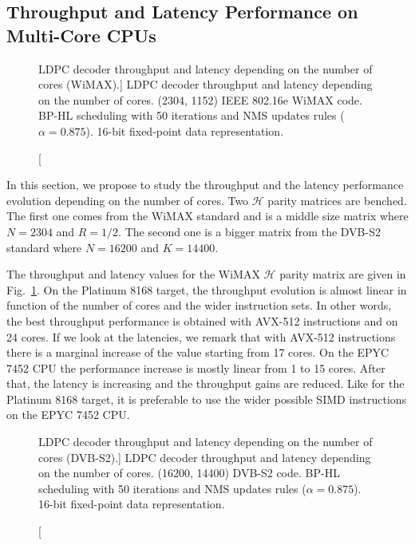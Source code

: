 \subsection{Throughput and Latency Performance on Multi-Core CPUs}

\begin{figure}[htp]
  \centering
  \quad
  \caption
    [LDPC decoder throughput and latency depending on the number of cores (WiMAX).]
    {LDPC decoder throughput and latency depending on the number of cores.
    (2304, 1152) IEEE 802.16e WiMAX code. BP-HL scheduling with 50 iterations
    and NMS updates rules ($\alpha = 0.875$). 16-bit fixed-point data
    representation.}
  \label{plot:eval_ldpc_WiMAX_thr_lat}
\end{figure}

In this section, we propose to study the throughput and the latency performance
evolution depending on the number of cores. Two $\mathcal{H}$ parity matrices
are benched. The first one comes from the WiMAX standard and is a middle size
matrix where $N = 2304$ and $R = 1/2$. The second one is a bigger matrix from
the DVB-S2 standard where $N = 16200$ and $K = 14400$.

The throughput and latency values for the WiMAX $\mathcal{H}$ parity matrix are
given in Fig.~\ref{plot:eval_ldpc_WiMAX_thr_lat}. On the Platinum 8168 target,
the throughput evolution is almost linear in function of the number of cores and
the wider instruction sets. In other words, the best throughput performance is
obtained with AVX-512 instructions and on 24 cores. If we look at the latencies,
we remark that with AVX-512 instructions there is a marginal increase of the
value starting from 17 cores. On the EPYC 7452 CPU the performance increase is
mostly linear from 1 to 15 cores. After that, the latency is increasing and the
throughput gains are reduced. Like for the Platinum 8168 target, it is
preferable to use the wider possible SIMD instructions on the EPYC 7452 CPU.

\begin{figure}[htp]
  \centering
  \quad
  \caption
    [LDPC decoder throughput and latency depending on the number of cores (DVB-S2).]
    {LDPC decoder throughput and latency depending on the number of cores.
    (16200, 14400) DVB-S2 code. BP-HL scheduling with 50 iterations and NMS
    updates rules ($\alpha = 0.875$). 16-bit fixed-point data representation.}
  \label{plot:eval_ldpc_DVB-S2_thr_lat}
\end{figure}

